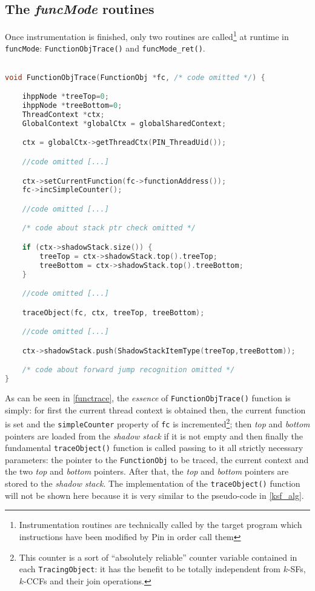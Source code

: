 \documentclass[a4paper,10pt]{report}
\begin{document}
\subsection{The \emph{funcMode} routines}

Once instrumentation is finished, only two routines are
called\footnote{Instrumentation routines are technically called by the target program
which instructions have been modified by Pin in order call them}
at runtime in \verb|funcMode|: \verb|FunctionObjTrace()| and \verb|funcMode_ret()|.

\begin{lstlisting}[language=C++,
	caption={a fragment of \texttt{FunctionObjTrace()} routine},
	label=functrace, frame=leftline]

void FunctionObjTrace(FunctionObj *fc, /* code omitted */) {

	ihppNode *treeTop=0;
	ihppNode *treeBottom=0;
	ThreadContext *ctx;
	GlobalContext *globalCtx = globalSharedContext;

	ctx = globalCtx->getThreadCtx(PIN_ThreadUid());

	//code omitted [...]

	ctx->setCurrentFunction(fc->functionAddress());
	fc->incSimpleCounter();

	//code omitted [...]

	/* code about stack ptr check omitted */

	if (ctx->shadowStack.size()) {
		treeTop = ctx->shadowStack.top().treeTop;
		treeBottom = ctx->shadowStack.top().treeBottom;
	}

	//code omitted [...]

	traceObject(fc, ctx, treeTop, treeBottom);

	//code omitted [...]

	ctx->shadowStack.push(ShadowStackItemType(treeTop,treeBottom));

	/* code about forward jump recognition omitted */
}

\end{lstlisting}

\noindent
As can be seen in \cref{functrace}, the \emph{essence} of \verb|FunctionObjTrace()|
function is simply: for first the current thread context is obtained then,
the current function is set and the \verb|simpleCounter| property of \verb|fc|
is incremented\footnote{This counter is
a sort of ``absolutely reliable'' counter variable contained in each \texttt{TracingObject}:
it has the benefit to be totally independent from $k$-SFs, $k$-CCFs and their join
operations.}; then \emph{top} and \emph{bottom} pointers are loaded from the
\emph{shadow stack} if it is not empty and then finally the fundamental \verb|traceObject()|
function is called passing to it all strictly necessary parameters:
the pointer to the \verb|FunctionObj| to be traced, the current context and the
two \emph{top} and \emph{bottom} pointers. After that, the \emph{top} and \emph{bottom} pointers are stored to the \emph{shadow stack}.
The implementation of the \verb|traceObject()| function will not be shown here
because it is very similar to the pseudo-code in \cref{ksf_alg}.
\end{document}
